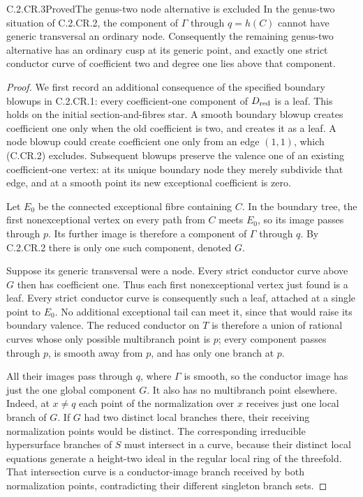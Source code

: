 \begin{statement}{C.2.CR.3}{Proved}{The genus-two node alternative is excluded}
In the genus-two situation of C.2.CR.2, the component
of $\Gamma$ through $q=h(C)$ cannot have generic
transversal an ordinary node. Consequently the
remaining genus-two alternative has an ordinary cusp
at its generic point, and exactly one strict conductor
curve of coefficient two and degree one lies above
that component.
\end{statement}
\begin{proof}
We first record an additional consequence of the
specified boundary blowups in C.2.CR.1: every
coefficient-one component of $D_{\rm red}$ is a leaf.
This holds on the initial section-and-fibres star.
A smooth boundary blowup creates coefficient one
only when the old coefficient is two, and creates
it as a leaf. A node blowup could create coefficient
one only from an edge $(1,1)$, which (C.CR.2)
excludes. Subsequent blowups preserve the valence
one of an existing coefficient-one vertex: at its
unique boundary node they merely subdivide that edge,
and at a smooth point its new exceptional coefficient
is zero.

Let $E_0$ be the connected exceptional fibre containing
$C$. In the boundary tree, the first nonexceptional
vertex on every path from $C$ meets $E_0$, so its image
passes through $p$. Its further image is therefore
a component of $\Gamma$ through $q$. By C.2.CR.2
there is only one such component, denoted $G$.

Suppose its generic transversal were a node.
Every strict conductor curve above $G$ then has
coefficient one. Thus each first nonexceptional
vertex just found is a leaf. Every strict conductor
curve is consequently such a leaf, attached at a
single point to $E_0$. No additional exceptional
tail can meet it, since that would raise its
boundary valence. The reduced conductor on $T$
is therefore a union of rational curves whose only
possible multibranch point is $p$; every component
passes through $p$, is smooth away from $p$, and
has only one branch at $p$.

All their images pass through $q$, where $\Gamma$
is smooth, so the conductor image has just the one
global component $G$. It also has no multibranch
point elsewhere. Indeed, at $x\ne q$ each point
of the normalization over $x$ receives just one
local branch of $G$. If $G$ had two distinct local
branches there, their receiving normalization
points would be distinct. The corresponding
irreducible hypersurface branches of $S$ must
intersect in a curve, because their distinct
local equations generate a height-two ideal in
the regular local ring of the threefold. That
intersection curve is a conductor-image branch
received by both normalization points, contradicting
their different singleton branch sets.


\end{proof}
